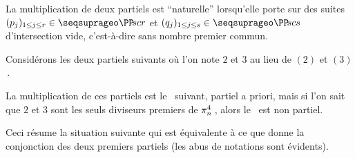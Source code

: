 \begin{example}
	La multiplication de deux \sftab[x] partiels est \enquote{naturelle} lorsqu'elle porte sur des suites
	$( p_j )_{1 \leq j \leq r} \in \PPseq[r]$
	et
	$( q_j )_{1 \leq j \leq s} \in \PPseq[s]$
	d'intersection vide, c'est-à-dire sans nombre premier commun.
	
	\newpage	
	Considérons les deux \sftab[x] partiels suivants où l'on note $2$ et $3$ au lieu de $(2)$ et $(3)$\,.

	\vspace{-1.5ex}
	\begin{multicols}{2}
	\begin{center}
	\end{center}

	\begin{center}
	\end{center}
	\end{multicols}


	\vspace{-1ex}
	La multiplication de ces \sftab[x] partiels est le \sftab\  suivant, partiel a priori, mais si l'on sait que $2$ et $3$ sont les seuls diviseurs premiers de $\consprod<4>$\,, alors le \sftab\ est non partiel.

	\begin{center}
	\end{center}

	Ceci résume la situation suivante qui est équivalente à ce que donne la conjonction des deux premiers \sftab[x] partiels (les abus de notations sont évidents).



\end{example}
